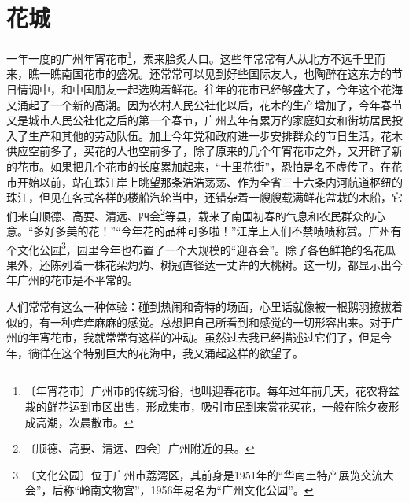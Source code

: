 \documentclass[12pt,UTF-8,openany]{ctexbook}
\begin{document}
\chapter{花城}

\begin{large}
    
    一年一度的广州年宵花市\footnote{〔年宵花市〕广州市的传统习俗，也叫迎春花市。每年过年前几天，花农将盆栽的鲜花运到市区出售，形成集市，吸引市民到来赏花买花，一般在除夕夜形成高潮，次晨散市。}，素来脍炙人口。这些年常常有人从北方不远千里而来，瞧一瞧南国花市的盛况。还常常可以见到好些国际友人，也陶醉在这东方的节日情调中，和中国朋友一起选购着鲜花。往年的花市已经够盛大了，今年这个花海又涌起了一个新的高潮。因为农村人民公社化以后，花木的生产增加了，今年春节又是城市人民公社化之后的第一个春节，广州去年有累万的家庭妇女和街坊居民投入了生产和其他的劳动队伍。加上今年党和政府进一步安排群众的节日生活，花木供应空前多了，买花的人也空前多了，除了原来的几个年宵花市之外，又开辟了新的花市。如果把几个花市的长度累加起来，“十里花街”，恐怕是名不虚传了。在花市开始以前，站在珠江岸上眺望那条浩浩荡荡、作为全省三十六条内河航道枢纽的珠江，但见在各式各样的楼船汽轮当中，还错杂着一艘艘载满鲜花盆栽的木船，它们来自顺德、高要、清远、四会\footnote{〔顺德、高要、清远、四会〕广州附近的县。}等县，载来了南国初春的气息和农民群众的心意。“多好多美的花！”“今年花的品种可多啦！”江岸上人们不禁啧啧称赏。广州有个文化公园\footnote{〔文化公园〕位于广州市荔湾区，其前身是1951年的“华南土特产展览交流大会”，后称“岭南文物宫”，1956年易名为“广州文化公园”。}，园里今年也布置了一个大规模的“迎春会”。除了各色鲜艳的名花瓜果外，还陈列着一株花朵灼灼、树冠直径达一丈许的大桃树。这一切，都显示出今年广州的花市是不平常的。
    
    人们常常有这么一种体验：碰到热闹和奇特的场面，心里话就像被一根鹅羽撩拔着似的，有一种痒痒麻麻的感觉。总想把自己所看到和感觉的一切形容出来。对于广州的年宵花市，我就常常有这样的冲动。虽然过去我已经描述过它们了，但是今年，徜徉在这个特别巨大的花海中，我又涌起这样的欲望了。
    

\end{large}
\end{document}
